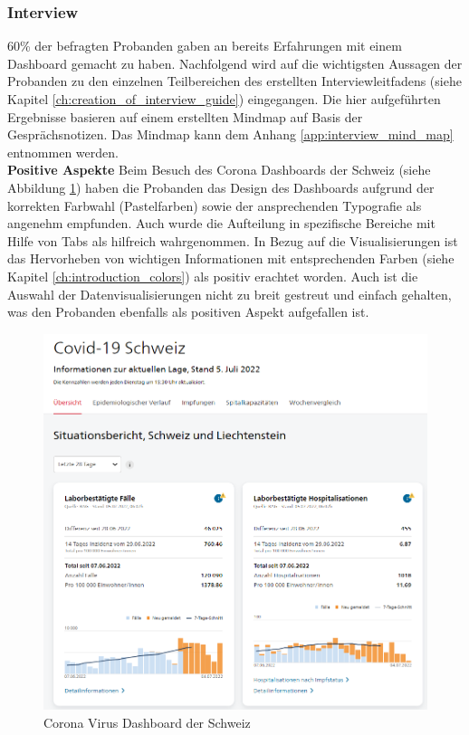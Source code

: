 \subsubsection{Interview}
60\% der befragten Probanden gaben an bereits Erfahrungen mit einem Dashboard gemacht zu haben. Nachfolgend wird auf die wichtigsten Aussagen der Probanden zu den einzelnen Teilbereichen des erstellten Interviewleitfadens (siehe Kapitel \ref{ch:creation_of_interview_guide}) eingegangen. Die hier aufgeführten Ergebnisse basieren auf einem erstellten Mindmap auf Basis der Gesprächsnotizen. Das Mindmap kann dem Anhang \ref{app:interview_mind_map} entnommen werden.\\

\clearpage
\noindent
\textbf{Positive Aspekte}
\newline
\indent
Beim Besuch des Corona Dashboards der Schweiz (siehe Abbildung \ref{fig:corona_dashboard_switzerland}) haben die Probanden das Design des Dashboards aufgrund der korrekten Farbwahl (Pastelfarben) sowie der ansprechenden Typografie als angenehm empfunden. Auch wurde die Aufteilung in spezifische Bereiche mit Hilfe von Tabs als hilfreich wahrgenommen. In Bezug auf die Visualisierungen ist das Hervorheben von wichtigen Informationen mit entsprechenden Farben (siehe Kapitel \ref{ch:introduction_colors}) als positiv erachtet worden. Auch ist die Auswahl der Datenvisualisierungen nicht zu breit gestreut und einfach gehalten, was den Probanden ebenfalls als positiven Aspekt aufgefallen ist. 

\begin{figure}[h]
    \includegraphics[width=14cm]{images/covid_dashboard_switzerland.png}
    \centering
    \caption{Corona Virus Dashboard der Schweiz ~\citep{corona_dashboard_switzerland}}
    \label{fig:corona_dashboard_switzerland}
\end{figure}

